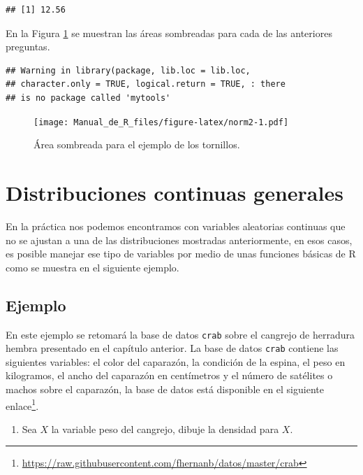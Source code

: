 \documentclass[10pt,]{krantz}
\providecommand{\tightlist}{%
  \setlength{\itemsep}{0pt}\setlength{\parskip}{0pt}}
\let\proglang=\textsf
\renewcommand{\href}[2]{#2\footnote{\url{#1}}}
\begin{document}
\begin{verbatim}
## [1] 12.56
\end{verbatim}

En la Figura \ref{fig:norm2} se muestran las áreas sombreadas para cada
de las anteriores preguntas.

\begin{verbatim}
## Warning in library(package, lib.loc = lib.loc,
## character.only = TRUE, logical.return = TRUE, : there
## is no package called 'mytools'
\end{verbatim}

\begin{figure}
\centering
\texttt{[image: Manual\_de\_R\_files/figure-latex/norm2-1.pdf]}
\caption{\label{fig:norm2}Área sombreada para el ejemplo de los tornillos.}
\end{figure}

\section{Distribuciones continuas
generales}\label{distribuciones-continuas-generales}

En la práctica nos podemos encontramos con variables aleatorias
continuas que no se ajustan a una de las distribuciones mostradas
anteriormente, en esos casos, es posible manejar ese tipo de variables
por medio de unas funciones básicas de \proglang{R} como se muestra en
el siguiente ejemplo.

\subsection*{Ejemplo}\label{ejemplo-48}


En este ejemplo se retomará la base de datos \texttt{crab} sobre el
cangrejo de herradura hembra presentado en el capítulo anterior. La base
de datos \texttt{crab} contiene las siguientes variables: el color del
caparazón, la condición de la espina, el peso en kilogramos, el ancho
del caparazón en centímetros y el número de satélites o machos sobre el
caparazón, la base de datos está disponible en el siguiente
\href{https://raw.githubusercontent.com/fhernanb/datos/master/crab}{enlace}.

\begin{enumerate}
\def\labelenumi{\arabic{enumi})}
\tightlist
\item
  Sea \(X\) la variable peso del cangrejo, dibuje la densidad para
  \(X\).
\end{enumerate}
\end{document}
